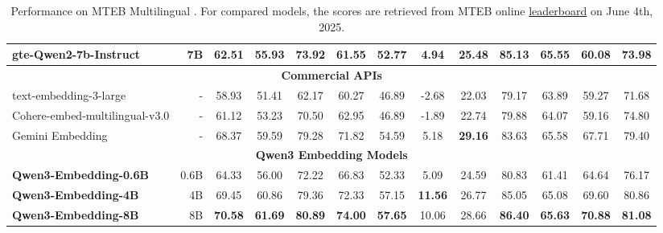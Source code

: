 \begin{table}[h]
{\begin{tabular}{lr|c|c|ccccccccc}
gte-Qwen2-7b-Instruct & 7B   & 62.51 & 55.93 & 73.92 & 61.55 & 52.77 & 4.94 & 25.48 & 85.13 & 65.55 & 60.08 & 73.98 \\
\midrule
\multicolumn{13}{c}{\textbf{Commercial APIs}} \\
\midrule
text-embedding-3-large &  -    & 58.93 & 51.41 & 62.17 & 60.27 & 46.89 & -2.68 & 22.03 & 79.17 & 63.89 & 59.27 & 71.68 \\
Cohere-embed-multilingual-v3.0 & - &  61.12 & 53.23 & 70.50 & 62.95 & 46.89 & -1.89 & 22.74 & 79.88 & 64.07 & 59.16 & 74.80 \\
Gemini Embedding      & -    & 68.37 & 59.59 & 79.28 & 71.82 & 54.59 & 5.18 & \bf{29.16} & 83.63 & 65.58 & 67.71 & 79.40 \\
\midrule
\multicolumn{13}{c}{\textbf{Qwen3 Embedding Models}} \\
\midrule
\bf Qwen3-Embedding-0.6B     & 0.6B    & 64.33 & 56.00 & 72.22 & 66.83 & 52.33 & 5.09 & 24.59 & 80.83 & 61.41 & 64.64 & 76.17 \\
\bf Qwen3-Embedding-4B     & 4B    & 69.45 & 60.86 & 79.36 & 72.33 & 57.15 & \bf{11.56} & 26.77 & 85.05 & 65.08 & 69.60 & 80.86 \\
\bf Qwen3-Embedding-8B     & 8B    & \bf{70.58} & \bf{61.69} & \bf{80.89} & \bf{74.00} & \bf{57.65} & 10.06 &  28.66 & \bf{86.40} & \bf{65.63} & \bf{70.88} & \bf{81.08} \\
\bottomrule
\end{tabular}
}
\caption{Performance on MTEB Multilingual \citep{enevoldsen2025mmteb}. For compared models, the scores are retrieved from MTEB online \href{https://huggingface.co/spaces/mteb/leaderboard}{leaderboard} on June 4th, 2025.}
\label{tab:model_comparison}
\end{table}